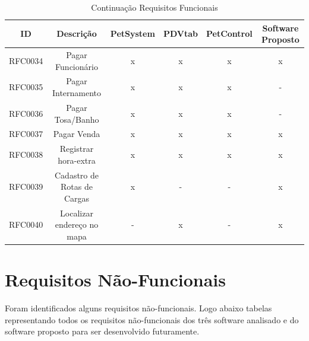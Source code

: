 \documentclass[12pt,openright,twoside,a4paper,english,french,spanish,brazil]{abntex2}
\begin{document}
\begin{landscape}
\begin{table}[!htpb]
\centering
\caption{Continuação Requisitos Funcionais}\label{tab02_requisitosFuncionais}
\begin{small} 
\setlength{\tabcolsep}{3pt} 
\begin{tabular}{rccccc}
    \toprule
    \multicolumn{1}{c}{\textbf{ID}} & \textbf{Descrição} & \textbf{PetSystem} & \textbf{PDVtab} & \textbf{PetControl} & \textbf{Software Proposto} \\
    \midrule
    RFC0034 & Pagar Funcionário & x & x & x & x \\
    RFC0035 & Pagar Internamento & x & x & x & - \\
    RFC0036 & Pagar Tosa/Banho & x & x & x & - \\
    RFC0037 & Pagar Venda & x & x & x & x \\
    RFC0038 & Registrar hora-extra & x & x & x & x \\
    RFC0039 & Cadastro de Rotas de Cargas & x & - & - & x \\
    RFC0040 & Localizar endereço no mapa & - & x & - & x \\
    \bottomrule
    \end{tabular}%
\end{small}
\end{table}
\end{landscape}

\section*{Requisitos Não-Funcionais}

Foram identificados alguns requisitos não-funcionais. Logo abaixo tabelas representando todos os requisitos não-funcionais dos três software analisado e do software proposto para ser desenvolvido futuramente.
\newpage
\end{document}
